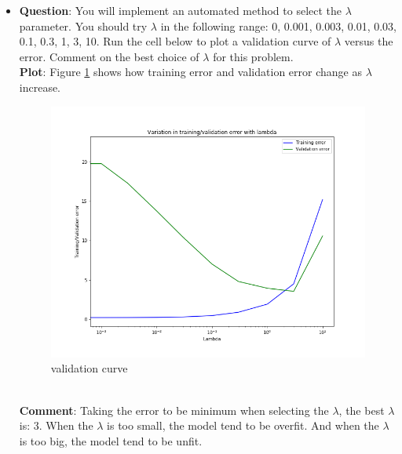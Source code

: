 \documentclass[paper=a4, fontsize=11pt]{scrartcl} %
\numberwithin{equation}{section} %
\numberwithin{figure}{section} %
\numberwithin{table}{section} %
\begin{document}
\begin{itemize}
     \item
        \textbf{Question}: You will implement an automated method to select the $\lambda$ parameter. You should try $\lambda$ in the following range: {0, 0.001, 0.003, 0.01, 0.03, 0.1, 0.3, 1, 3, 10}. Run the cell below to plot a validation curve of $\lambda$ versus the error. Comment on the best choice of $\lambda$ for this problem.
        \\ \textbf{Plot}:
        Figure \ref{fig:validationCurve} shows how training error and validation error change as $\lambda$ increase.
        \begin{figure}
     		\centering
     		\includegraphics[scale=0.3]{validation_curve.png}
     		\caption{validation curve}
     		\label{fig:validationCurve}
     	\end{figure}
     \\ \textbf{Comment}: Taking the error to be minimum when selecting the $\lambda$, the best $\lambda$ is: 3. When the $\lambda$ is too small, the model tend to be overfit. And when the $\lambda$ is too big, the model tend to be unfit.
\end{itemize}
\end{document}
